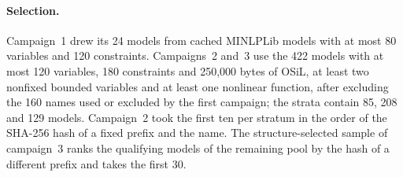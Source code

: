 \paragraph{Selection.}
Campaign~1 drew its 24 models from cached MINLPLib models with at most
80 variables and 120 constraints. Campaigns~2 and~3 use the 422 models
with at most 120 variables, 180 constraints and 250{,}000 bytes of OSiL,
at least two nonfixed bounded variables and at least one nonlinear
function, after excluding the 160 names used or excluded by the first
campaign; the strata contain 85, 208 and 129 models. Campaign~2 took the
first ten per stratum in the order of the SHA-256 hash of a fixed prefix
and the name. The structure-selected sample of campaign~3 ranks the
qualifying models of the remaining pool by the hash of a different prefix
and takes the first 30.


